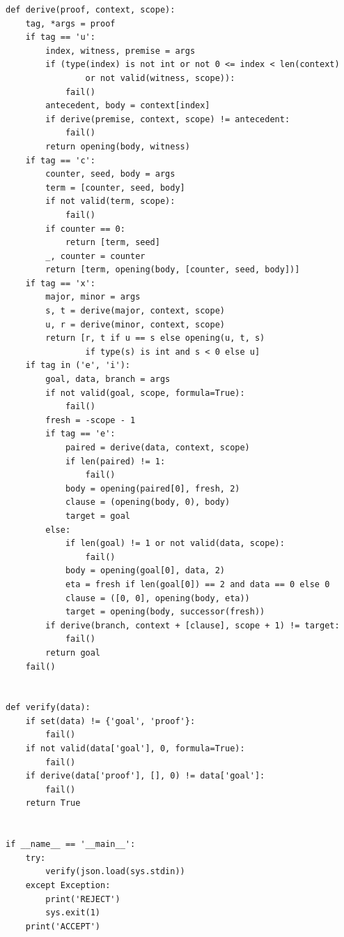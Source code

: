 \documentclass[11pt,letterpaper]{article}
\begin{document}
\begin{lstlisting}
def derive(proof, context, scope):
    tag, *args = proof
    if tag == 'u':
        index, witness, premise = args
        if (type(index) is not int or not 0 <= index < len(context)
                or not valid(witness, scope)):
            fail()
        antecedent, body = context[index]
        if derive(premise, context, scope) != antecedent:
            fail()
        return opening(body, witness)
    if tag == 'c':
        counter, seed, body = args
        term = [counter, seed, body]
        if not valid(term, scope):
            fail()
        if counter == 0:
            return [term, seed]
        _, counter = counter
        return [term, opening(body, [counter, seed, body])]
    if tag == 'x':
        major, minor = args
        s, t = derive(major, context, scope)
        u, r = derive(minor, context, scope)
        return [r, t if u == s else opening(u, t, s)
                if type(s) is int and s < 0 else u]
    if tag in ('e', 'i'):
        goal, data, branch = args
        if not valid(goal, scope, formula=True):
            fail()
        fresh = -scope - 1
        if tag == 'e':
            paired = derive(data, context, scope)
            if len(paired) != 1:
                fail()
            body = opening(paired[0], fresh, 2)
            clause = (opening(body, 0), body)
            target = goal
        else:
            if len(goal) != 1 or not valid(data, scope):
                fail()
            body = opening(goal[0], data, 2)
            eta = fresh if len(goal[0]) == 2 and data == 0 else 0
            clause = ([0, 0], opening(body, eta))
            target = opening(body, successor(fresh))
        if derive(branch, context + [clause], scope + 1) != target:
            fail()
        return goal
    fail()


def verify(data):
    if set(data) != {'goal', 'proof'}:
        fail()
    if not valid(data['goal'], 0, formula=True):
        fail()
    if derive(data['proof'], [], 0) != data['goal']:
        fail()
    return True


if __name__ == '__main__':
    try:
        verify(json.load(sys.stdin))
    except Exception:
        print('REJECT')
        sys.exit(1)
    print('ACCEPT')



\end{lstlisting}
\end{document}
